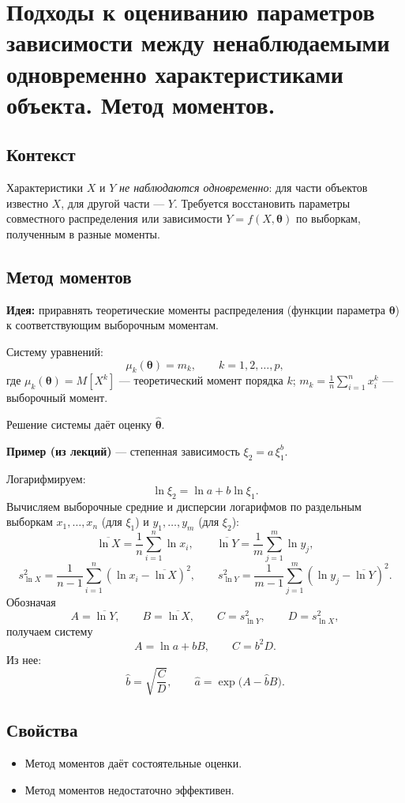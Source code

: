 \section{Подходы к оцениванию параметров зависимости между ненаблюдаемыми одновременно характеристиками объекта. Метод моментов.}

\subsection*{Контекст}

Характеристики $X$ и $Y$ \emph{не наблюдаются одновременно}: для части объектов известно $X$, для другой части — $Y$. Требуется восстановить параметры совместного распределения или зависимости $Y = f(X, \boldsymbol{\theta})$ по выборкам, полученным в разные моменты.

\subsection*{Метод моментов}

\textbf{Идея:} приравнять теоретические моменты распределения (функции параметра $\boldsymbol{\theta}$) к соответствующим выборочным моментам.

Систему уравнений:
\[
  \mu_k(\boldsymbol{\theta}) = m_k, \qquad k = 1, 2, \ldots, p,
\]
где $\mu_k(\boldsymbol{\theta}) = M[X^k]$ — теоретический момент порядка $k$;
$m_k = \frac{1}{n}\sum_{i=1}^n x_i^k$ — выборочный момент.

Решение системы даёт оценку $\hat{\boldsymbol{\theta}}$.

\textbf{Пример (из лекций)} — степенная зависимость $\xi_2 = a\,\xi_1^{b}$.

Логарифмируем:
\[
  \ln \xi_2 = \ln a + b\ln \xi_1.
\]
Вычисляем выборочные средние и дисперсии логарифмов по раздельным выборкам $x_1,\ldots,x_n$ (для $\xi_1$) и $y_1,\ldots,y_m$ (для $\xi_2$):
\[
  \overline{\ln X} = \frac{1}{n}\sum_{i=1}^n \ln x_i, \qquad
  \overline{\ln Y} = \frac{1}{m}\sum_{j=1}^m \ln y_j,
\]
\[
  s^2_{\ln X} = \frac{1}{n-1}\sum_{i=1}^n(\ln x_i - \overline{\ln X})^2, \qquad
  s^2_{\ln Y} = \frac{1}{m-1}\sum_{j=1}^m(\ln y_j - \overline{\ln Y})^2.
\]
Обозначая
\[
  A=\overline{\ln Y}, \qquad B=\overline{\ln X}, \qquad
  C=s^2_{\ln Y}, \qquad D=s^2_{\ln X},
\]
получаем систему
\[
  A = \ln a + bB, \qquad C=b^2D.
\]
Из нее:
\[
  \hat b = \sqrt{\frac{C}{D}}, \qquad
  \hat a = \exp\!\bigl(A-\hat bB\bigr).
\]

\subsection*{Свойства}

\begin{itemize}
  \item Метод моментов даёт состоятельные оценки.
  \item Метод моментов недостаточно эффективен.
\end{itemize}

\clearpage
